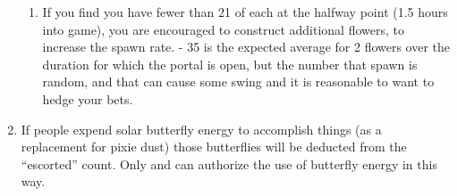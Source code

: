 \documentclass[green]{PP}
\begin{document}
\begin{enumerate}
\begin{enumerate}
		\item If you find you have fewer than 21 of each at the halfway point (1.5 hours into game), you are encouraged to construct additional flowers, to increase the spawn rate. - 35 is the expected average for 2 flowers over the duration for which the portal is open, but the number that spawn is random, and that can cause some swing and it is reasonable to want to hedge your bets.
	\end{enumerate}
	\item If people expend solar butterfly energy to accomplish things (as a replacement for pixie dust) those butterflies will be deducted from the “escorted” count. Only \cFButterfly{} and \cFHead{} can authorize the use of butterfly energy in this way. 
\end{enumerate}
\end{document}
